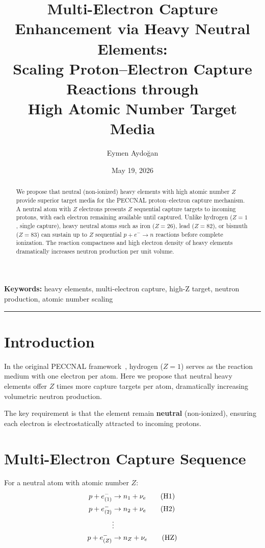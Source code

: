 \documentclass[12pt,a4paper]{article}
\title{\textbf{Multi-Electron Capture Enhancement via Heavy Neutral Elements:\\
Scaling Proton--Electron Capture Reactions through\\
High Atomic Number Target Media}}
\author{Eymen Aydoğan}
\date{May 19, 2026}
\begin{document}
\maketitle

\begin{abstract}
We propose that neutral (non-ionized) heavy elements with high
atomic number $Z$ provide superior target media for the PECCNAL
proton--electron capture mechanism. A neutral atom with $Z$ electrons
presents $Z$ sequential capture targets to incoming protons, with
each electron remaining available until captured. Unlike hydrogen
($Z=1$, single capture), heavy neutral atoms such as iron ($Z=26$),
lead ($Z=82$), or bismuth ($Z=83$) can sustain up to $Z$ sequential
$p + e^- \rightarrow n$ reactions before complete ionization.
The reaction compactness and high electron density of heavy elements
dramatically increases neutron production per unit volume.
\end{abstract}

\noindent\textbf{Keywords:} heavy elements, multi-electron capture,
high-Z target, neutron production, atomic number scaling

\hrule\vspace{1em}

\section{Introduction}
In the original PECCNAL framework~\cite{aydogan2026a}, hydrogen
($Z=1$) serves as the reaction medium with one electron per atom.
Here we propose that neutral heavy elements offer $Z$ times more
capture targets per atom, dramatically increasing volumetric
neutron production.

The key requirement is that the element remain \textbf{neutral}
(non-ionized), ensuring each electron is electrostatically
attracted to incoming protons.

\section{Multi-Electron Capture Sequence}

For a neutral atom with atomic number $Z$:
\begin{align}
p + e^-_{(1)} &\rightarrow n_1 + \nu_e \tag{H1}\\
p + e^-_{(2)} &\rightarrow n_2 + \nu_e \tag{H2}\\
&\vdots \notag\\
p + e^-_{(Z)} &\rightarrow n_Z + \nu_e \tag{HZ}
\end{align}
\end{document}
